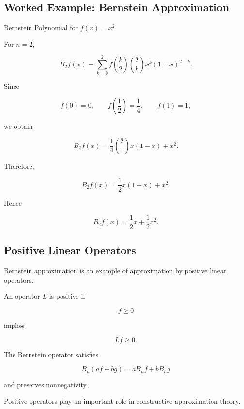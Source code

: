 \subsection{Worked Example: Bernstein Approximation}
\label{subsec:worked-bernstein}

\begin{workedexamplebox}{Bernstein Polynomial for \(f(x)=x^2\)}

For \(n=2\),

\[
B_2f(x)
=
\sum_{k=0}^{2}
f\left(\frac{k}{2}\right)
\binom{2}{k}
x^k(1-x)^{2-k}.
\]

Since

\[
f(0)=0,
\qquad
f\left(\frac12\right)=\frac14,
\qquad
f(1)=1,
\]

we obtain

\[
B_2f(x)
=
\frac14
\binom21
x(1-x)
+
x^2.
\]

Therefore,

\[
B_2f(x)
=
\frac12x(1-x)+x^2.
\]

Hence

\begin{answerbox}
\[
\boxed{
B_2f(x)
=
\frac12x+\frac12x^2.
}
\]
\end{answerbox}

\end{workedexamplebox}

\subsection{Positive Linear Operators}
\label{subsec:positive-linear-operators}

Bernstein approximation is an example of approximation by positive
linear operators.

An operator \(L\) is positive if

\[
f\geq0
\]

implies

\[
\boxed{
Lf\geq0.
}
\]

The Bernstein operator satisfies

\[
\boxed{
B_n(af+bg)
=
aB_nf+bB_ng
}
\]

and preserves nonnegativity.

Positive operators play an important role in constructive approximation
theory.

